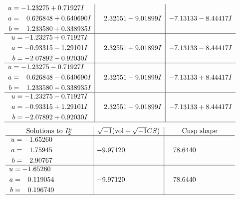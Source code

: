 \documentclass[1p]{elsarticle_modified}
\theoremstyle{definition}
\newcommand{\I}{\sqrt{-1}}
\begin{document}
$$\begin{array}{c|c|c}
\begin{aligned}
u &= -1.23275 + 0.71927 I \\
a &= \phantom{-}0.626848 + 0.640690 I \\
b &= \phantom{-}1.233580 + 0.338935 I\end{aligned}
 & \phantom{-}2.32551 + 9.01899 I & -7.13133 - 8.44417 I \\ \hline\begin{aligned}
u &= -1.23275 + 0.71927 I \\
a &= -0.93315 - 1.29101 I \\
b &= -2.07892 - 0.92030 I\end{aligned}
 & \phantom{-}2.32551 + 9.01899 I & -7.13133 - 8.44417 I \\ \hline\begin{aligned}
u &= -1.23275 - 0.71927 I \\
a &= \phantom{-}0.626848 - 0.640690 I \\
b &= \phantom{-}1.233580 - 0.338935 I\end{aligned}
 & \phantom{-}2.32551 - 9.01899 I & -7.13133 + 8.44417 I \\ \hline\begin{aligned}
u &= -1.23275 - 0.71927 I \\
a &= -0.93315 + 1.29101 I \\
b &= -2.07892 + 0.92030 I\end{aligned}
 & \phantom{-}2.32551 - 9.01899 I & -7.13133 + 8.44417 I\\
 \hline 
 \end{array}$$\newpage$$\begin{array}{c|c|c}  
\text{Solutions to }I^u_{2}& \I (\text{vol} + \sqrt{-1}CS) & \text{Cusp shape}\\
 \hline 
\begin{aligned}
u &= -1.65260\phantom{ +0.000000I} \\
a &= \phantom{-}1.75945\phantom{ +0.000000I} \\
b &= \phantom{-}2.90767\phantom{ +0.000000I}\end{aligned}
 & -9.97120\phantom{ +0.000000I} & \phantom{-}78.6440\phantom{ +0.000000I} \\ \hline\begin{aligned}
u &= -1.65260\phantom{ +0.000000I} \\
a &= \phantom{-}0.119054\phantom{ +0.000000I} \\
b &= \phantom{-}0.196749\phantom{ +0.000000I}\end{aligned}
 & -9.97120\phantom{ +0.000000I} & \phantom{-}78.6440\phantom{ +0.000000I}\\
 \hline 
 \end{array}$$\newpage\newpage\renewcommand{\arraystretch}{1}
\end{document}
